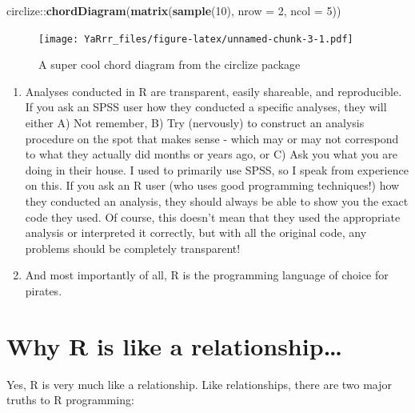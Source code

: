 \documentclass[]{book}
\newenvironment{Shaded}{\begin{snugshade}}{\end{snugshade}}
\newcommand{\KeywordTok}[1]{\textcolor[rgb]{0.13,0.29,0.53}{\textbf{{#1}}}}
\newcommand{\DataTypeTok}[1]{\textcolor[rgb]{0.13,0.29,0.53}{{#1}}}
\newcommand{\DecValTok}[1]{\textcolor[rgb]{0.00,0.00,0.81}{{#1}}}
\newcommand{\NormalTok}[1]{{#1}}
\theoremstyle{definition}
\theoremstyle{definition}
\theoremstyle{remark}
\begin{document}
\begin{Shaded}
\begin{Highlighting}[]
\NormalTok{circlize::}\KeywordTok{chordDiagram}\NormalTok{(}\KeywordTok{matrix}\NormalTok{(}\KeywordTok{sample}\NormalTok{(}\DecValTok{10}\NormalTok{), }
                              \DataTypeTok{nrow =} \DecValTok{2}\NormalTok{, }\DataTypeTok{ncol =} \DecValTok{5}\NormalTok{))}
\end{Highlighting}
\end{Shaded}

\begin{figure}[htbp]
\centering
\texttt{[image: YaRrr\_files/figure-latex/unnamed-chunk-3-1.pdf]}
\caption{\label{fig:unnamed-chunk-3}A super cool chord diagram from the
circlize package}
\end{figure}

\begin{enumerate}
\def\labelenumi{\arabic{enumi}.}
\setcounter{enumi}{4}
\item
  Analyses conducted in R are transparent, easily shareable, and
  reproducible. If you ask an SPSS user how they conducted a specific
  analyses, they will either A) Not remember, B) Try (nervously) to
  construct an analysis procedure on the spot that makes sense - which
  may or may not correspond to what they actually did months or years
  ago, or C) Ask you what you are doing in their house. I used to
  primarily use SPSS, so I speak from experience on this. If you ask an
  R user (who uses good programming techniques!) how they conducted an
  analysis, they should always be able to show you the exact code they
  used. Of course, this doesn't mean that they used the appropriate
  analysis or interpreted it correctly, but with all the original code,
  any problems should be completely transparent!
\item
  And most importantly of all, R is the programming language of choice
  for pirates.
\end{enumerate}

\hypertarget{rrelationship}{\section{Why R is like a
relationship\ldots{}}\label{rrelationship}}

Yes, R is very much like a relationship. Like relationships, there are
two major truths to R programming:
\end{document}
